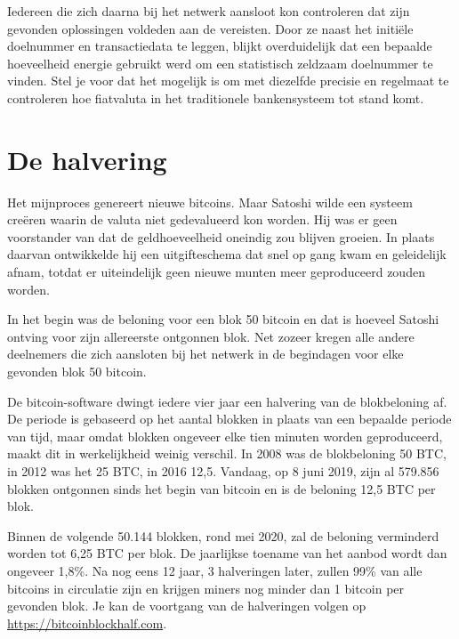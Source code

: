 Iedereen die zich daarna bij het netwerk aansloot kon controleren dat zijn gevonden oplossingen voldeden aan de vereisten. Door ze naast het initiële doelnummer en transactiedata te leggen, blijkt overduidelijk dat een bepaalde hoeveelheid energie gebruikt werd om een statistisch zeldzaam doelnummer te vinden. Stel je voor dat het mogelijk is om met diezelfde precisie en regelmaat te controleren hoe fiatvaluta in het traditionele bankensysteem tot stand komt.

\section{De halvering}
Het mijnproces genereert nieuwe bitcoins. Maar Satoshi wilde een systeem creëren waarin de valuta niet gedevalueerd kon worden. Hij was er geen voorstander van dat de geldhoeveelheid oneindig zou blijven groeien. In plaats daarvan ontwikkelde hij een uitgifteschema dat snel op gang kwam en geleidelijk afnam, totdat er uiteindelijk geen nieuwe munten meer geproduceerd zouden worden.

In het begin was de beloning voor een blok 50 bitcoin en dat is hoeveel Satoshi ontving voor zijn allereerste ontgonnen blok. Net zozeer kregen alle andere deelnemers die zich aansloten bij het netwerk in de begindagen voor elke gevonden blok 50 bitcoin.

De bitcoin-software dwingt iedere vier jaar een halvering van de blokbeloning af. De periode is gebaseerd op het aantal blokken in plaats van een bepaalde periode van tijd, maar omdat blokken ongeveer elke tien minuten worden geproduceerd, maakt dit in werkelijkheid weinig verschil. In 2008 was de blokbeloning 50 BTC, in 2012 was het 25 BTC, in 2016 12,5. Vandaag, op 8 juni 2019, zijn al 579.856 blokken ontgonnen sinds het begin van bitcoin en is de beloning 12,5 BTC per blok.

Binnen de volgende 50.144 blokken, rond mei 2020, zal de beloning verminderd worden tot 6,25 BTC per blok. De jaarlijkse toename van het aanbod wordt dan ongeveer 1,8\%. Na nog eens 12 jaar, 3 halveringen later, zullen 99\% van alle bitcoins in circulatie zijn en krijgen miners nog minder dan 1 bitcoin per gevonden blok. Je kan de voortgang van de halveringen volgen op \href{https://bitcoinblockhalf.com}{https://bitcoinblockhalf.com}.

